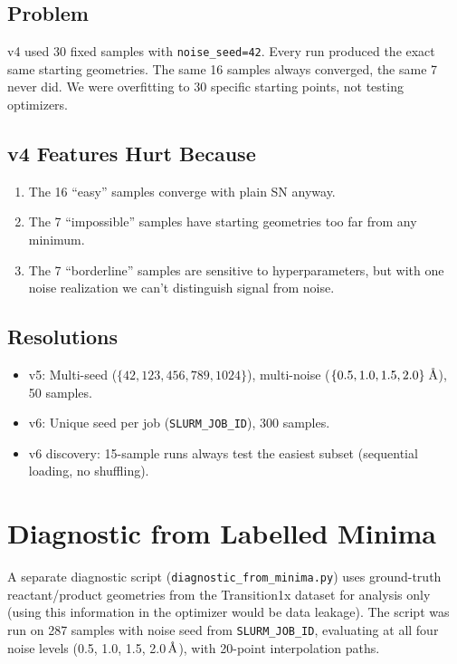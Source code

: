 \documentclass[11pt,a4paper]{article}
\newcommand{\angstrom}{\text{\r{A}}}
\begin{document}
\subsection{Problem}

v4 used 30 fixed samples with \texttt{noise\_seed=42}. Every run produced the exact same starting geometries. The same 16 samples always converged, the same 7 never did. We were overfitting to 30 specific starting points, not testing optimizers.

\subsection{v4 Features Hurt Because}

\begin{enumerate}
  \item The 16 ``easy'' samples converge with plain SN anyway.
  \item The 7 ``impossible'' samples have starting geometries too far from any minimum.
  \item The 7 ``borderline'' samples are sensitive to hyperparameters, but with one noise realization we can't distinguish signal from noise.
\end{enumerate}

\subsection{Resolutions}

\begin{itemize}
  \item v5: Multi-seed ($\{42, 123, 456, 789, 1024\}$), multi-noise ($\{0.5, 1.0, 1.5, 2.0\}\;\angstrom$), 50 samples.
  \item v6: Unique seed per job (\texttt{SLURM\_JOB\_ID}), 300 samples.
  \item v6 discovery: 15-sample runs always test the easiest subset (sequential loading, no shuffling).
\end{itemize}

\section{Diagnostic from Labelled Minima}
\label{sec:diagnostic-minima}

A separate diagnostic script (\texttt{diagnostic\_from\_minima.py}) uses ground-truth reactant/product geometries from the Transition1x dataset for analysis only (using this information in the optimizer would be data leakage). The script was run on 287 samples with noise seed from \texttt{SLURM\_JOB\_ID}, evaluating at all four noise levels (0.5, 1.0, 1.5, 2.0\,$\angstrom$), with 20-point interpolation paths.
\end{document}
